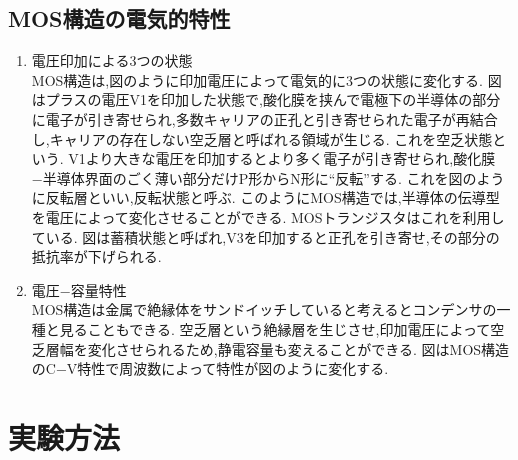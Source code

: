 \documentclass[11pt]{jarticle}
\begin{document}
	\subsection{MOS構造の電気的特性}
		\begin{enumerate}
			\item 電圧印加による3つの状態\\
				MOS構造は,図のように印加電圧によって電気的に3つの状態に変化する.
				図はプラスの電圧V1を印加した状態で,酸化膜を挟んで電極下の半導体の部分に電子が引き寄せられ,多数キャリアの正孔と引き寄せられた電子が再結合し,キャリアの存在しない空乏層と呼ばれる領域が生じる.
				これを空乏状態という.
				V1より大きな電圧を印加するとより多く電子が引き寄せられ,酸化膜−半導体界面のごく薄い部分だけP形からN形に``反転''する.
				これを図のように反転層といい,反転状態と呼ぶ.
				このようにMOS構造では,半導体の伝導型を電圧によって変化させることができる.
				MOSトランジスタはこれを利用している.
				図は蓄積状態と呼ばれ,V3を印加すると正孔を引き寄せ,その部分の抵抗率が下げられる.

			\item 電圧−容量特性\\
				MOS構造は金属で絶縁体をサンドイッチしていると考えるとコンデンサの一種と見ることもできる.
				空乏層という絶縁層を生じさせ,印加電圧によって空乏層幅を変化させられるため,静電容量も変えることができる.
				図はMOS構造のC−V特性で周波数によって特性が図のように変化する.

		\end{enumerate}

\section{実験方法}
\end{document}

